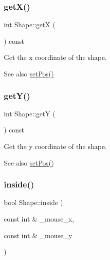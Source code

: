 \subsubsection{\texorpdfstring{get\+X()}{getX()}}
{\footnotesize\ttfamily int Shape\+::getX (\begin{DoxyParamCaption}{ }\end{DoxyParamCaption}) const\hspace{0.3cm}{\ttfamily [inline]}}



Get the x coordinate of the shape. 

\begin{DoxySeeAlso}{See also}
\mbox{\hyperlink{class_shape_aa743a709f100d8e17b3bb577d4697480}{set\+Pos()}} 
\end{DoxySeeAlso}
\mbox{\label{class_shape_a2e87ea4122381ffb83474f4b69247ded}} 
\subsubsection{\texorpdfstring{get\+Y()}{getY()}}
{\footnotesize\ttfamily int Shape\+::getY (\begin{DoxyParamCaption}{ }\end{DoxyParamCaption}) const\hspace{0.3cm}{\ttfamily [inline]}}



Get the y coordinate of the shape. 

\begin{DoxySeeAlso}{See also}
\mbox{\hyperlink{class_shape_aa743a709f100d8e17b3bb577d4697480}{set\+Pos()}} 
\end{DoxySeeAlso}
\mbox{\label{class_shape_a4c01d871d08fae8b9ab27fa808f8056a}} 
\subsubsection{\texorpdfstring{inside()}{inside()}}
{\footnotesize\ttfamily bool Shape\+::inside (\begin{DoxyParamCaption}\item[{const int \&}]{\+\_\+mouse\+\_\+x,  }\item[{const int \&}]{\+\_\+mouse\+\_\+y }\end{DoxyParamCaption})\hspace{0.3cm}{\ttfamily [inline]}}



